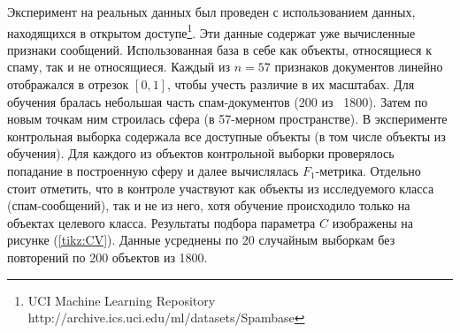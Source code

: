 Эксперимент на реальных данных был проведен с использованием данных, находящихся в открытом доступе\footnote{UCI Machine Learning Repository \textsf{http://archive.ics.uci.edu/ml/datasets/Spambase}}. 
Эти данные содержат уже вычисленные признаки сообщений.
Использованная база в себе как объекты, относящиеся к спаму, так и не относящиеся.
Каждый из $n = 57$ признаков документов линейно отображался в отрезок $[0, 1]$, чтобы учесть различие в их масштабах. 
Для обучения бралась небольшая часть спам-документов (200 из ~1800).
Затем по новым точкам ним строилась сфера (в 57-мерном пространстве).
В эксперименте контрольная выборка содержала все доступные объекты (в том числе объекты из обучения). 
Для каждого из объектов контрольной выборки проверялось попадание в построенную сферу и далее вычислялась $F_1$-метрика.
Отдельно стоит отметить, что в контроле участвуют как объекты из исследуемого класса (спам-сообщений), так и не из него, хотя обучение происходило только на объектах целевого класса.
Результаты подбора параметра $C$ изображены на рисунке (\ref{tikz:CV}). Данные усреднены по 20 случайным выборкам без повторений по 200 объектов из 1800.

